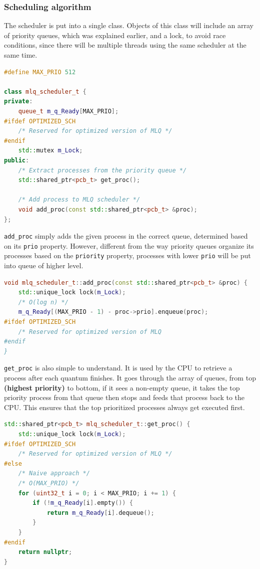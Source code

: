 \documentclass[]{article}
\begin{document}
\subsubsection{Scheduling algorithm}
The scheduler is put into a single class. Objects of this class will include an array of priority queues, which was explained earlier, and a lock, to avoid race conditions, since there will be multiple threads using the same scheduler at the same time.
\begin{lstlisting}[language=C++]
#define MAX_PRIO 512

class mlq_scheduler_t {
private:
	queue_t m_q_Ready[MAX_PRIO];
#ifdef OPTIMIZED_SCH
	/* Reserved for optimized version of MLQ */
#endif
	std::mutex m_Lock;
public:
	/* Extract processes from the priority queue */
	std::shared_ptr<pcb_t> get_proc();
	
	/* Add process to MLQ scheduler */
	void add_proc(const std::shared_ptr<pcb_t> &proc);
};
\end{lstlisting}
\lstinline|add_proc| simply adds the given process in the correct queue, determined based on its \lstinline|prio| property. However, different from the way priority queues organize its processes based on the \lstinline|priority| property, processes with lower \lstinline|prio| will be put into queue of higher level.
\begin{lstlisting}[language=C++]
void mlq_scheduler_t::add_proc(const std::shared_ptr<pcb_t> &proc) {
	std::unique_lock lock(m_Lock);
	/* O(log n) */
	m_q_Ready[(MAX_PRIO - 1) - proc->prio].enqueue(proc);
#ifdef OPTIMIZED_SCH
	/* Reserved for optimized version of MLQ
#endif
}
\end{lstlisting}
\lstinline|get_proc| is also simple to understand. It is used by the CPU to retrieve a process after each quantum finishes. It goes through the array of queues, from top \textbf{(highest priority)} to bottom, if it sees a non-empty queue, it takes the top priority process from that queue then stops and feeds that process back to the CPU. This ensures that the top prioritized processes always get executed first.
\begin{lstlisting}[language=C++]
std::shared_ptr<pcb_t> mlq_scheduler_t::get_proc() {
	std::unique_lock lock(m_Lock);
#ifdef OPTIMIZED_SCH
	/* Reserved for optimized version of MLQ */
#else
	/* Naive approach */
	/* O(MAX_PRIO) */
	for (uint32_t i = 0; i < MAX_PRIO; i += 1) {
		if (!m_q_Ready[i].empty()) {
			return m_q_Ready[i].dequeue();
		}
	}
#endif
	return nullptr;
}
\end{lstlisting}
\end{document}
